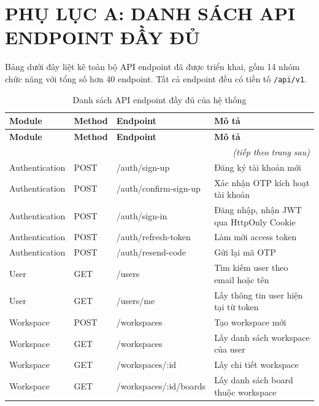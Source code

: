 \clearpage
\appendix

\section{PHỤ LỤC A: DANH SÁCH API ENDPOINT ĐẦY ĐỦ}
\label{appendix:api}

Bảng dưới đây liệt kê toàn bộ API endpoint đã được triển khai, gồm 14 nhóm chức năng với tổng số hơn 40 endpoint. Tất cả endpoint đều có tiền tố \texttt{/api/v1}.

\begin{longtable}{|l|l|p{5.5cm}|p{4.5cm}|}
\hline
\rowcolor{gray!20}
\textbf{Module} & \textbf{Method} & \textbf{Endpoint} & \textbf{Mô tả} \\
\hline
\endfirsthead
\hline
\rowcolor{gray!20}
\textbf{Module} & \textbf{Method} & \textbf{Endpoint} & \textbf{Mô tả} \\
\hline
\endhead
\hline
\multicolumn{4}{r}{\textit{(tiếp theo trang sau)}} \\
\endfoot
\hline
\caption{Danh sách API endpoint đầy đủ của hệ thống}
\label{tab:api_full}
\endlastfoot
Authentication & POST & /auth/sign-up & Đăng ký tài khoản mới \\
\hline
Authentication & POST & /auth/confirm-sign-up & Xác nhận OTP kích hoạt tài khoản \\
\hline
Authentication & POST & /auth/sign-in & Đăng nhập, nhận JWT qua HttpOnly Cookie \\
\hline
Authentication & POST & /auth/refresh-token & Làm mới access token \\
\hline
Authentication & POST & /auth/resend-code & Gửi lại mã OTP \\
\hline
User & GET & /users & Tìm kiếm user theo email hoặc tên \\
\hline
User & GET & /users/me & Lấy thông tin user hiện tại từ token \\
\hline
Workspace & POST & /workspaces & Tạo workspace mới \\
\hline
Workspace & GET & /workspaces & Lấy danh sách workspace của user \\
\hline
Workspace & GET & /workspaces/:id & Lấy chi tiết workspace \\
\hline
Workspace & GET & /workspaces/:id/boards & Lấy danh sách board thuộc workspace \\

\end{longtable}
